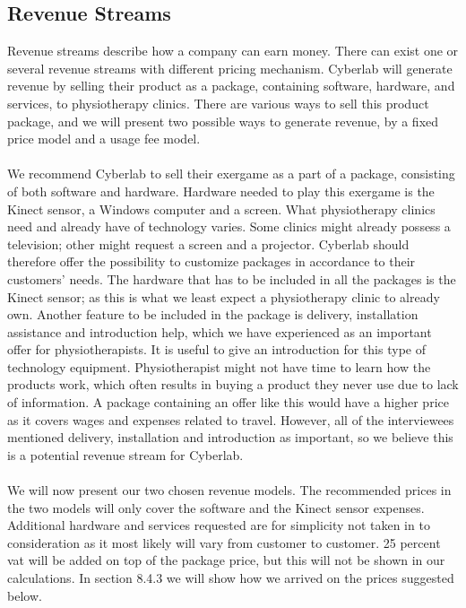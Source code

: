 \subsection{Revenue Streams}
Revenue streams describe how a company can earn money. There can exist one or several revenue streams with different pricing mechanism. Cyberlab will generate revenue by selling their product as a package, containing software, hardware, and services, to physiotherapy clinics. There are various ways to sell this product package, and we will present two possible ways to generate revenue, by a fixed price model and a usage fee model. \\ \\ 
We recommend Cyberlab to sell their exergame as a part of a package, consisting of both software and hardware. Hardware needed to play this exergame is the Kinect sensor, a Windows computer and a screen. What physiotherapy clinics need and already have of technology varies. Some clinics might already possess a television; other might request a screen and a projector. Cyberlab should therefore offer the possibility to customize packages in accordance to their customers' needs. The hardware that has to be included in all the packages is the Kinect sensor; as this is what we least expect a physiotherapy clinic to already own. Another feature to be included in the package is delivery, installation assistance and introduction help, which we have experienced as an important offer for physiotherapists. It is useful to give an introduction for this type of technology equipment. Physiotherapist might not have time to learn how the products work, which often results in buying a product they never use due to lack of information. A package containing an offer like this would have a higher price as it covers wages and expenses related to travel. However, all of the interviewees mentioned delivery, installation and introduction as important, so we believe this is a potential revenue stream for Cyberlab. \\ \\ 
We will now present our two chosen revenue models. The recommended prices in the two models will only cover the software and the Kinect sensor expenses. Additional hardware and services requested are for simplicity not taken in to consideration as it most likely will vary from customer to customer. 25 percent \ac{vat} will be added on top of the package price, but this will not be shown in our calculations. In section 8.4.3 we will show how we arrived on the prices suggested below.\\ \\
